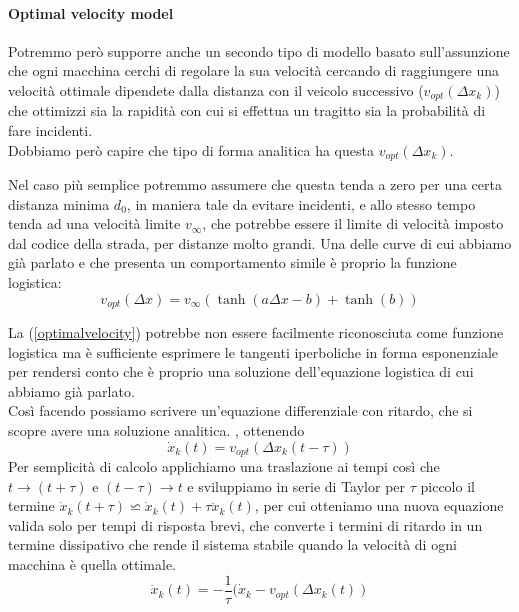 \paragraph{Optimal velocity model}Potremmo però supporre anche un secondo tipo di modello basato sull'assunzione che ogni macchina cerchi di regolare la sua velocità cercando di raggiungere una velocità ottimale dipendete dalla distanza con il veicolo successivo ($v_{opt}(\Delta x_k)$) che ottimizzi sia la rapidità con cui si effettua un tragitto sia la probabilità di fare incidenti. \\ Dobbiamo però capire che tipo di forma analitica ha questa $v_{opt}(\Delta x_k)$. 

\begin{multicols}{2}
	 Nel caso più semplice potremmo assumere che questa tenda a zero per una certa distanza minima $d_0$, in maniera tale da evitare incidenti, e allo stesso tempo tenda ad una velocità limite $v_\infty$, che potrebbe essere il limite di velocità imposto dal codice della strada, per distanze molto grandi. Una delle curve di cui abbiamo già parlato e che presenta un comportamento simile è proprio la funzione logistica:
	 \begin{equation}
	 	v_{opt}(\Delta x)= v_\infty(\tanh(a\Delta x-b)+\tanh(b))
	 	\label{optimalvelocity}
	 \end{equation}
	
	
\end{multicols}
La (\ref{optimalvelocity}) potrebbe non essere facilmente riconosciuta come funzione logistica ma è sufficiente esprimere le tangenti iperboliche in forma esponenziale per rendersi conto che è proprio una soluzione dell'equazione logistica di cui abbiamo già parlato.\\

Così facendo possiamo scrivere un'equazione differenziale con ritardo, che si scopre avere una soluzione analitica. , ottenendo
\begin{equation}
	\dot{x}_k(t)=v_{opt}(\Delta x_k(t-\tau))
	\label{ovmdiffeq}
\end{equation} 
Per semplicità di calcolo applichiamo una traslazione ai tempi così che $t\rightarrow (t+\tau)$ e $(t-\tau)\rightarrow t$ e sviluppiamo in serie di Taylor per $\tau$ piccolo il termine $\dot{x}_k(t+\tau)\backsimeq \dot{x}_k(t)+\tau \ddot{x}_k(t)$, per cui otteniamo una nuova equazione valida solo per tempi di risposta brevi, che converte i termini di ritardo in un termine dissipativo che rende il sistema stabile quando la velocità di ogni macchina è quella ottimale.
\begin{equation}
	\ddot{x}_k(t)=-\frac{1}{\tau}(\dot{x}_k-v_{opt}(\Delta x_k(t))
	\label{eqddissipazione}
\end{equation}

